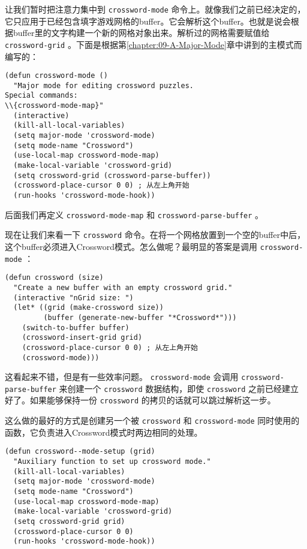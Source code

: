 让我们暂时把注意力集中到 \texttt{crossword-mode} 命令上。就像我们之前已经决定的，它只应用于已经包含填字游戏网格的buffer。它会解析这个buffer。也就是说会根据buffer里的文字构建一个新的网格对象出来。解析过的网格需要赋值给 \texttt{crossword-grid} 。下面是根据第\ref{chapter:09-A-Major-Mode}章中讲到的主模式而编写的：

\begin{verbatim}
(defun crossword-mode ()
  "Major mode for editing crossword puzzles.
Special commands:
\\{crossword-mode-map}"
  (interactive)
  (kill-all-local-variables)
  (setq major-mode 'crossword-mode)
  (setq mode-name "Crossword")
  (use-local-map crossword-mode-map)
  (make-local-variable 'crossword-grid)
  (setq crossword-grid (crossword-parse-buffer))
  (crossword-place-cursor 0 0) ; 从左上角开始
  (run-hooks 'crossword-mode-hook))
\end{verbatim}

后面我们再定义 \texttt{crossword-mode-map} 和 \texttt{crossword-parse-buffer} 。

现在让我们来看一下 \texttt{crossword} 命令。在将一个网格放置到一个空的buffer中后，这个buffer必须进入Crossword模式。怎么做呢？最明显的答案是调用 \texttt{crossword-mode} ：

\begin{verbatim}
(defun crossword (size)
  "Create a new buffer with an empty crossword grid."
  (interactive "nGrid size: ")
  (let* ((grid (make-crossword size))
         (buffer (generate-new-buffer "*Crossword*")))
    (switch-to-buffer buffer)
    (crossword-insert-grid grid)
    (crossword-place-cursor 0 0) ; 从左上角开始
    (crossword-mode)))
\end{verbatim}

这看起来不错，但是有一些效率问题。 \texttt{crossword-mode} 会调用 \texttt{crossword-parse-buffer} 来创建一个 \texttt{crossword} 数据结构，即使 \texttt{crossword} 之前已经建立好了。如果能够保持一份 \texttt{crossword} 的拷贝的话就可以跳过解析这一步。

这么做的最好的方式是创建另一个被 \texttt{crossword} 和 \texttt{crossword-mode} 同时使用的函数，它负责进入Crossword模式时两边相同的处理。

\begin{verbatim}
(defun crossword--mode-setup (grid)
  "Auxiliary function to set up crossword mode."
  (kill-all-local-variables)
  (setq major-mode 'crossword-mode)
  (setq mode-name "Crossword")
  (use-local-map crossword-mode-map)
  (make-local-variable 'crossword-grid)
  (setq crossword-grid grid)
  (crossword-place-cursor 0 0)
  (run-hooks 'crossword-mode-hook))
\end{verbatim}

